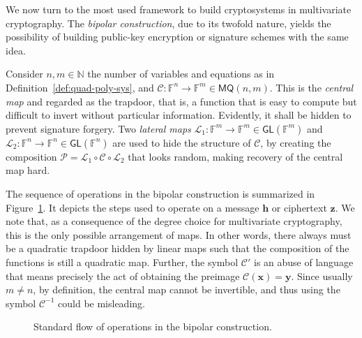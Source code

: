\documentclass[12pt, a4paper, oneside]{memoir}
\theoremstyle{definition}
\begin{document}
We now turn to the most used framework to build cryptosystems in multivariate cryptography. The \emph{bipolar construction}, due to its twofold nature, yields the possibility of building public-key encryption or signature schemes with the same idea.

Consider $n, m \in \mathbb{N}$ the number of variables and equations as in Definition~\ref{def:quad-poly-sys}, and $\mathcal{C} : \mathbb{F}^{n} \to \mathbb{F}^{m} \in \mathsf{MQ}(n, m)$. This is the \emph{central map} and regarded as the trapdoor, that is, a function that is easy to compute but difficult to invert without particular information. Evidently, it shall be hidden to prevent signature forgery. Two \emph{lateral maps} $\mathcal{L}_{1} : \mathbb{F}^{m} \to \mathbb{F}^{m} \in \mathsf{GL}(\mathbb{F}^{m})$ and $\mathcal{L}_{2} : \mathbb{F}^{n} \to \mathbb{F}^{n} \in \mathsf{GL}(\mathbb{F}^{n})$ are used to hide the structure of $\mathcal{C}$, by creating the composition $\mathcal{P} = \mathcal{L}_{1} \circ \mathcal{C} \circ \mathcal{L}_{2}$ that looks random, making recovery of the central map hard. 

The sequence of operations in the bipolar construction is summarized in Figure~\ref{fig:bipolar}. It depicts the steps used to operate on a message $\mathbf{h}$ or ciphertext $\mathbf{z}$. We note that, as a consequence of the degree choice for multivariate cryptography, this is the only possible arrangement of maps. In other words, there always must be a quadratic trapdoor hidden by linear maps such that the composition of the functions is still a quadratic map. Further, the symbol $\mathcal{C}'$ is an abuse of language that means precisely the act of obtaining the preimage $\mathcal{C}(\mathbf{x}) = \mathbf{y}$. Since usually $m \neq n$, by definition, the central map cannot be invertible, and thus using the symbol $\mathcal{C}^{-1}$ could be misleading.

\begin{figure}[htbp]
  \centering
  \caption{Standard flow of operations in the bipolar
    construction.}\label{fig:bipolar}
\end{figure}
\end{document}
